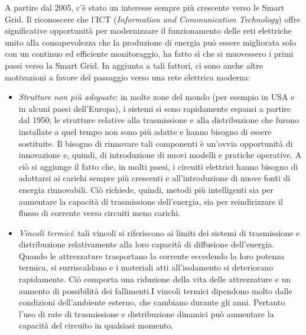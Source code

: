 A partire dal 2005, c'è stato un interesse sempre più crescente verso le Smart Grid. Il riconoscere che l'ICT (\textit{Information and Communication Technology}) offre significative opportunità per modernizzare il funzionamento delle reti elettriche unito alla consapevolezza che la produzione di energia può essere migliorata solo con un continuo ed efficiente monitoraggio, ha fatto sì che si muovessero i primi passi verso la Smart Grid. In aggiunta a tali fattori, ci sono anche altre motivazioni a favore del passaggio verso una rete elettrica moderna:
\begin{itemize}
\item \textit{Strutture non più adeguate}: in molte zone del mondo (per esempio in USA e in alcuni paesi dell'Europa), i sistemi si sono rapidamente espansi a partire dal 1950; le strutture relative alla trasmissione e alla distribuzione che furono installate a quel tempo non sono più adatte e hanno bisogno di essere sostituite. \newline Il bisogno di rinnovare tali componenti è un'ovvia opportunità di innovazione e, quindi, di introduzione di nuovi modelli e pratiche operative. \newline A ciò si aggiunge il fatto che, in molti paesi, i circuiti elettrici hanno bisogno di adattarsi ai carichi sempre più crescenti e all'introduzione di nuove fonti di energia rinnovabili. Ciò richiede, quindi, metodi più intelligenti sia per aumentare la capacità di trasmissione dell'energia, sia per reindirizzare il flusso di corrente verso circuiti meno carichi.

\item \textit{Vincoli termici}: tali vincoli si riferiscono ai limiti dei sistemi di trasmissione e distribuzione relativamente alla loro capacità di diffusione dell'energia. Quando le attrezzature trasportano la corrente eccedendo la loro potenza termica, si surriscaldano e i materiali atti all'isolamento si deteriorano rapidamente. Ciò comporta una riduzione della vita delle attrezzature e un aumento di possibilità dei fallimenti.\newline I vincoli termici dipendono molto dalle condizioni dell'ambiente esterno, che cambiano durante gli anni. Pertanto l'uso di rate di trasmissione e distribuzione dinamici può aumentare la capacità del circuito in qualsiasi momento.


\end{itemize}
